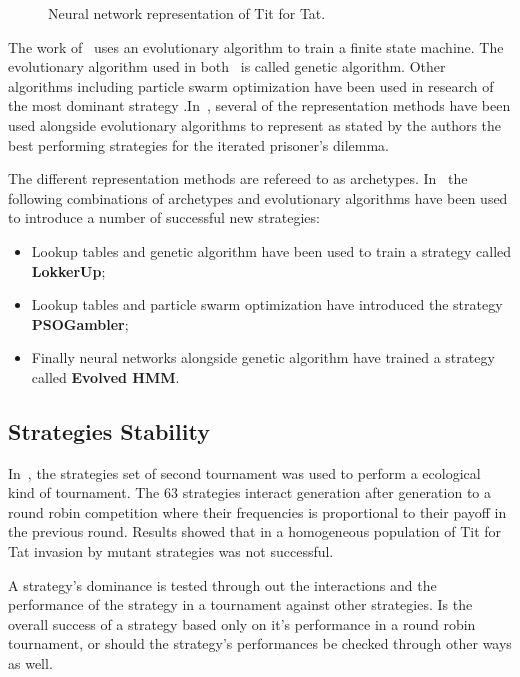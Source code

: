 \documentclass{article}
\begin{document}
\begin{figure}[!hbtp]
    \centering
    
    \caption{Neural network representation of Tit for Tat.}
    \label{fig:tit_for_tat_neural}
\end{figure}

The work of~\cite{Gaudesi2016} uses an evolutionary algorithm to train a finite
state machine. The evolutionary algorithm used in both~\cite{Axelrod1987,
Gaudesi2016} is called genetic algorithm. Other algorithms including particle
swarm optimization have been used in research of the most dominant strategy
\cite{Franken2005}.In~\cite{Knight2017}, several of the representation methods 
have been used alongside evolutionary algorithms to represent as stated by the
authors the best performing strategies for the iterated prisoner’s dilemma.

The different representation methods are refereed to as archetypes. In~\cite{Knight2017}
the following combinations of archetypes and evolutionary algorithms have 
been used to introduce a number of successful new strategies:

\begin{itemize}
    \item Lookup tables and genetic algorithm have been used to train a strategy 
    called \textbf{LokkerUp};
    \item Lookup tables and particle swarm optimization have introduced the 
    strategy \textbf{PSOGambler};
    \item Finally neural networks alongside genetic algorithm have trained a
    strategy called \textbf{Evolved HMM}.
\end{itemize}

\subsection{Strategies Stability}

In~\cite{Axelrod1981}, the strategies set of second tournament was used
to perform a ecological kind of tournament. The 63 strategies interact generation
after generation to a round robin competition where their frequencies is proportional
to their payoff in the previous round. Results showed that in a homogeneous
population of Tit for Tat invasion by mutant strategies was not successful.

A strategy's dominance is tested through out the interactions and the performance
of the strategy in a tournament against other strategies. Is the overall
success of a strategy based only on it's performance in a round robin tournament,
or should the strategy's performances be checked through other ways as well.
\end{document}
